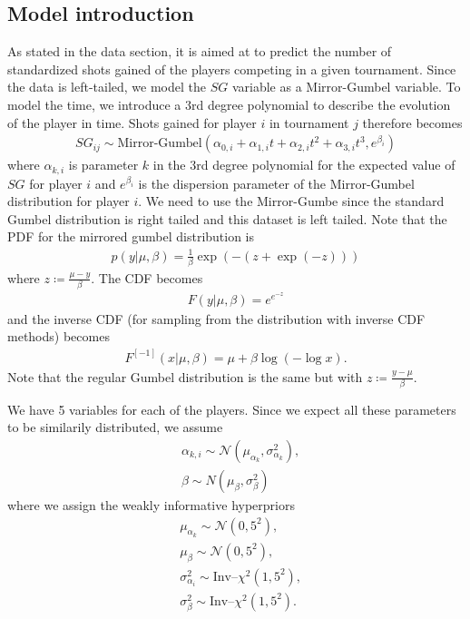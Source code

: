 \documentclass{article}\usepackage[]{graphicx}\usepackage[]{color}
\newcommand{\N}{\mathcal{N}}
\begin{document}
\subsection{Model introduction}
As stated in the data section, it is aimed at to predict the number of standardized shots gained of the players competing in a given tournament. Since the data is left-tailed, we model the $SG$ variable as a Mirror-Gumbel variable. To model the time, we introduce a 3rd degree polynomial to describe the evolution of the player in time. Shots gained for player $i$ in tournament $j$ therefore becomes
\begin{align*}
    SG_{ij} \sim \text{Mirror-Gumbel}(\alpha_{0,i} + \alpha_{1,i}t + \alpha_{2,i}t^2 + \alpha_{3,i}t^3, e^{\beta_i})
\end{align*}
where $\alpha_{k,i}$ is parameter $k$ in the 3rd degree polynomial for the expected value of $SG$ for player $i$ and $e^{\beta_i}$ is the dispersion parameter of the Mirror-Gumbel distribution for player $i$. We need to use the Mirror-Gumbe since the standard Gumbel distribution is right tailed and this dataset is left tailed. Note that the PDF for the mirrored gumbel distribution is
\begin{align*}
    p(y|\mu,\beta) = \frac1\beta\exp(-(z+\exp(-z)))
\end{align*}
where $z\coloneqq\frac{\mu-y}{\beta}$. The CDF becomes
\begin{align*}
    F(y|\mu,\beta) = e^{e^{-z}}
\end{align*}
and the inverse CDF (for sampling from the distribution with inverse CDF methods) becomes
\begin{align*}
    F^{[-1]}(x|\mu,\beta) = \mu + \beta\log(-\log{x}).
\end{align*}
Note that the regular Gumbel distribution is the same but with $z\coloneqq\frac{y-\mu}{\beta}$.
\medskip\par 
We have 5 variables for each of the players. Since we expect all these parameters to be similarily distributed, we assume
\begin{align*}
    &\alpha_{k,i} \sim \N(\mu_{\alpha_k}, \sigma_{\alpha_k}^2), \\
    &\beta \sim N(\mu_\beta, \sigma_\beta^2)
\end{align*}
where we assign the weakly informative hyperpriors
\begin{align*}
    &\mu_{\alpha_k} \sim \N(0,5^2), \\
    &\mu_\beta \sim \N(0,5^2), \\
    &\sigma^2_{\alpha_i} \sim \text{Inv–}\chi^2(1, 5^2), \\
    &\sigma_\beta^2 \sim \text{Inv–}\chi^2(1, 5^2).
\end{align*}
\end{document}
